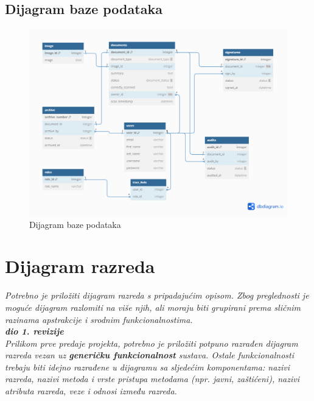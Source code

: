 				
			
			\subsection{Dijagram baze podataka}
				
				\begin{figure}[H]
					\includegraphics[width=\textwidth]{slike/dijagramBaze.PNG} 
					\caption{Dijagram baze podataka}
					\label{fig:dijagramBaze}
				\end{figure}
			
			\eject
			
			
		\section{Dijagram razreda}
		
			\textit{Potrebno je priložiti dijagram razreda s pripadajućim opisom. Zbog preglednosti je moguće dijagram razlomiti na više njih, ali moraju biti grupirani prema sličnim razinama apstrakcije i srodnim funkcionalnostima.}\\
			
			\textbf{\textit{dio 1. revizije}}\\
			
			\textit{Prilikom prve predaje projekta, potrebno je priložiti potpuno razrađen dijagram razreda vezan uz \textbf{generičku funkcionalnost} sustava. Ostale funkcionalnosti trebaju biti idejno razrađene u dijagramu sa sljedećim komponentama: nazivi razreda, nazivi metoda i vrste pristupa metodama (npr. javni, zaštićeni), nazivi atributa razreda, veze i odnosi između razreda.}\\
			
